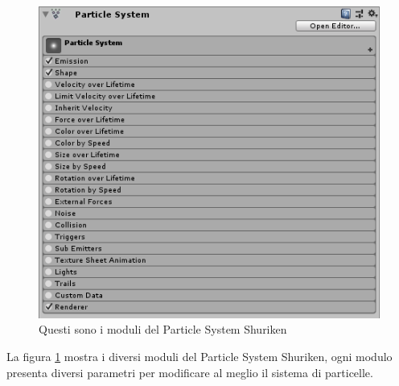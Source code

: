 \documentclass[12pt, openany]{book}
\begin{document}
		\begin{figure}[H]
			\centering
			\includegraphics[width=1\linewidth]{"Immagini/ParticleSystem"}
			\caption{Questi sono i moduli del Particle System Shuriken}
			\label{fig:ParticleSystem}
		\end{figure}
		La figura \ref{fig:ParticleSystem} mostra i diversi moduli  del Particle System Shuriken, ogni modulo presenta diversi parametri per modificare al meglio il sistema di particelle.
\end{document}
